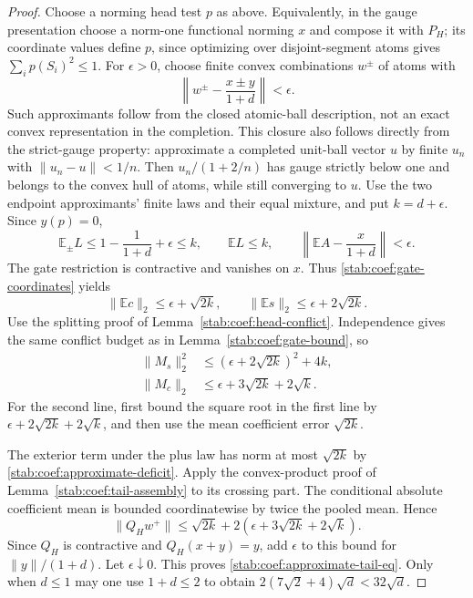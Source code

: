 \begin{proof}
Choose a norming head test $p$ as above. Equivalently, in the gauge
presentation choose a norm-one functional norming $x$ and compose
it with $P_H$; its coordinate values define $p$, since optimizing
over disjoint-segment atoms gives $\sum_i p(S_i)^2\le1$.
For $\epsilon>0$, choose finite convex combinations $w^\pm$ of
atoms with
\[
 \left\|w^\pm-\frac{x\pm y}{1+d}\right\|<\epsilon.
\]
Such approximants follow from the closed atomic-ball description,
not an exact convex representation in the completion. This closure
also follows directly from the strict-gauge property: approximate a
completed unit-ball vector $u$ by finite $u_n$ with
$\|u_n-u\|<1/n$. Then $u_n/(1+2/n)$ has gauge strictly below
one and belongs to the convex hull of atoms, while still converging
to $u$. Use the two endpoint approximants' finite
laws and their equal mixture, and put $k=d+\epsilon$. Since
$y(p)=0$,
\begin{equation}\label{stab:coef:approximate-deficit}
 \mathbb E_\pm L\le1-\frac1{1+d}+\epsilon\le k,
 \qquad \mathbb E L\le k,
 \qquad \left\|\mathbb EA-\frac{x}{1+d}\right\|<\epsilon.
\end{equation}
The gate restriction is contractive and vanishes on $x$. Thus
\eqref{stab:coef:gate-coordinates} yields
\begin{equation}\label{stab:coef:approximate-means}
 \|\mathbb Ec\|_2\le\epsilon+\sqrt{2k},\qquad
 \|\mathbb Es\|_2\le\epsilon+2\sqrt{2k}.
\end{equation}
Use the splitting proof of Lemma~\ref{stab:coef:head-conflict}.
Independence gives the same conflict budget as in
Lemma~\ref{stab:coef:gate-bound}, so
\begin{align}
 \|M_s\|_2^2&\le(\epsilon+2\sqrt{2k})^2+4k,
       \label{stab:coef:approximate-absolute-head}\\
 \|M_c\|_2&\le\epsilon+3\sqrt{2k}+2\sqrt k.
       \label{stab:coef:approximate-absolute-coef}
\end{align}
For the second line, first bound the square root in the first line
by $\epsilon+2\sqrt{2k}+2\sqrt k$, and then use the mean
coefficient error $\sqrt{2k}$.

The exterior term under the plus law has norm at most $\sqrt{2k}$
by \eqref{stab:coef:approximate-deficit}. Apply the convex-product
proof of Lemma~\ref{stab:coef:tail-assembly} to its crossing part.
The conditional absolute coefficient mean is bounded coordinatewise
by twice the pooled mean. Hence
\begin{equation}\label{stab:coef:approximate-conditional}
 \|Q_Hw^+\|\le\sqrt{2k}
       +2(\epsilon+3\sqrt{2k}+2\sqrt k).
\end{equation}
Since $Q_H$ is contractive and $Q_H(x+y)=y$, add $\epsilon$ to
this bound for $\|y\|/(1+d)$. Let $\epsilon\downarrow0$.
This proves \eqref{stab:coef:approximate-tail-eq}. Only when
$d\le1$ may one use $1+d\le2$ to obtain
$2(7\sqrt2+4)\sqrt d<32\sqrt d$.
\end{proof}

